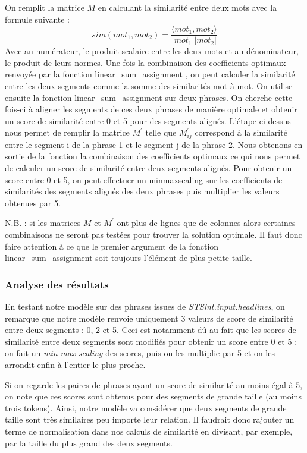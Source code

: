 \documentclass[a4paper, twoside, 11pt]{article}
\begin{document}
 On remplit la matrice $M$ en calculant la similarité entre deux mots avec la formule suivante :
 \begin{equation}
    sim(mot_{1}, mot_{2})=\frac{\langle mot_{1}, mot_{2}\rangle}{|mot_{1}||mot_{2}|}
 \end{equation}
 Avec au numérateur, le produit scalaire entre les deux mots et au dénominateur, le produit de leurs normes. Une fois la combinaison des coefficients optimaux renvoyée par la fonction \og linear\_sum\_assignment \fg{}, on peut calculer la similarité entre les deux segments comme la somme des similarités mot à mot. On utilise ensuite la fonction \og linear\_sum\_assignment \fg{} sur deux phrases. On cherche cette fois-ci à aligner les segments de ces deux phrases de manière optimale et obtenir un score de similarité entre 0 et 5 pour des segments alignés. L’étape ci-dessus nous permet de remplir la matrice $M^{\prime}$ telle que $M^{\prime}_{ij}$ correspond à la similarité entre le segment i de la phrase 1 et le segment j de la phrase 2. Nous obtenons en sortie de la fonction la combinaison des coefficients optimaux ce qui nous permet de calculer un score de similarité entre deux segments alignés. Pour obtenir un score entre 0 et 5, on peut effectuer un \og minmaxscaling \fg{} sur les coefficients de similarités des segments alignés des deux phrases puis multiplier les valeurs obtenues par 5.

N.B. : si les matrices $M$ et $M^{\prime}$ ont plus de lignes que de colonnes alors certaines combinaisons ne seront pas testées pour trouver la solution optimale.
Il faut donc faire attention à ce que le premier argument de la fonction \og linear\_sum\_assignment \fg{} soit toujours l’élément de plus petite taille.

 \subsubsection{Analyse des résultats}

 En testant notre modèle sur des phrases issues de \textit{STSint.input.headlines}, on remarque que notre modèle renvoie uniquement 3 valeurs de score de similarité entre deux segments : 0, 2 et 5. Ceci est notamment dû au fait que les scores de similarité entre deux segments sont modifiés pour obtenir un score entre 0 et 5 : on fait un \textit{min-max scaling} des scores, puis on les multiplie par 5 et on les arrondit enfin à l'entier le plus proche.

 Si on regarde les paires de phrases ayant un score de similarité au moins égal à 5, on note que ces scores sont obtenus pour des segments de grande taille (au moins trois tokens). Ainsi, notre modèle va considérer que deux segments de grande taille sont très similaires peu importe leur relation. Il faudrait donc rajouter un terme de normalisation dans nos calculs de similarité en divisant, par exemple, par la taille du plus grand des deux segments.
\end{document}
